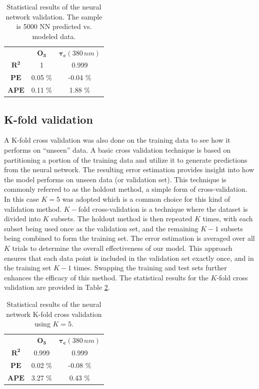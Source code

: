 \documentclass{optica-article}
\begin{document}
\begin{table}[H]	
	\centering
	\begin{tabular}{|c|c||c|}
		\hline
		& \textbf{O}$\bm{_3}$ & $\bm{\tau_c} {\scriptstyle(380 \, nm)}$  \\
		\Xhline{2\arrayrulewidth}
		$\bm{R^2}$	& 1 & 0.999 \\
		\hline
		$\bm{PE}$	& 0.05 \% & -0.04 \% \\
		\hline
		$\bm{APE}$	& 0.11 \%  & 1.88 \%  \\
		\hline
	\end{tabular}
	\caption{Statistical results of the neural network validation. The sample is 5000  NN predicted vs. modeled data.}
	\label{tab:nn_statistics}
\end{table}


\subsection{K-fold validation}
\label{sec-kfold}

A K-fold cross validation \cite{Hastie:2017} was also done on the training data to see how it performs on ``unseen'' data. 
A basic cross validation technique is based on partitioning a portion of the training data and utilize it to generate predictions from the neural network. 
The resulting error estimation provides insight into how the model performs on unseen data (or validation set). 
This technique is commonly referred to as the holdout method, a simple form of cross-validation.
In this case $K=5$ was adopted which is a common choice for this kind of validation method.
$K-$fold cross-validation is a technique where the dataset is divided into $K$ subsets. 
The holdout method is then repeated $K$ times, with each subset being used once as the validation set, and the remaining $K-1$ subsets being combined to form the training set. 
The error estimation is averaged over all $K$ trials to determine the overall effectiveness of our model. 
This approach ensures that each data point is included in the validation set exactly once, and in the training set $K-1$ times.  
Swapping the training and test sets further enhances the efficacy of this method. 
The statistical results  for the $K$-fold cross validation are provided in Table \ref{tab:nn_crossvalidation}.


\begin{table}[H]	
	\centering
	\begin{tabular}{|c|c||c|}
		\hline
		& \textbf{O}$\bm{_3}$  & $\bm{\tau_c} {\scriptstyle (380 \, nm)}$  \\
		\Xhline{2\arrayrulewidth}
		$\bm{R^2}$	& 0.999 & 0.999 \\
		\hline
		$\bm{PE}$	& 0.02 \% & -0.08 \% \\
		\hline
		$\bm{APE}$	& 3.27 \%  & 0.43 \%  \\
		\hline
	\end{tabular}
	\caption{Statistical results of the neural network K-fold cross validation using {$K=5$}.}
	\label{tab:nn_crossvalidation}
\end{table}
\end{document}
